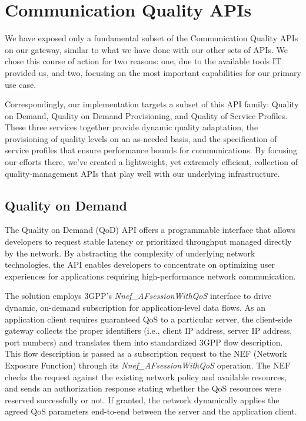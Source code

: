 
\section{Communication Quality APIs}

We have exposed only a fundamental subset of the Communication Quality APIs on our gateway, similar to what we have done with our other sets of APIs. We chose this course of action for two reasons: one, due to the available tools IT provided us, and two, focusing on the most important capabilities for our primary use case.

Correspondingly, our implementation targets a subset of this API family: Quality on Demand, Quality on Demand Provisioning, and Quality of Service Profiles. These three services together provide dynamic quality adaptation, the provisioning of quality levels on an as-needed basis, and the specification of service profiles that ensure performance bounds for communications. By focusing our efforts there, we’ve created a lightweight, yet extremely efficient, collection of quality-management APIs that play well with our underlying infrastructure.

\subsection{Quality on Demand}

The Quality on Demand (QoD) API offers a programmable interface that allows developers to request stable latency or prioritized throughput managed directly by the network. By abstracting the complexity of underlying network technologies, the API enables developers to concentrate on optimizing user experiences for applications requiring high-performance network communication.

The solution employs 3GPP’s \emph{Nnef\_AFsessionWithQoS} interface to drive dynamic, on-demand subscription for application-level data flows. As an application client requires guaranteed QoS to a particular server, the client-side gateway collects the proper identifiers (i.e., client IP address, server IP address, port numbers) and translates them into standardized 3GPP flow description. This flow description is passed as a subscription request to the NEF (Network Exposure Function) through its \emph{Nnef\_AFsessionWithQoS} operation. The NEF checks the request against the existing network policy and available resources, and sends an authorization response stating whether the QoS resources were reserved successfully or not. If granted, the network dynamically applies the agreed QoS parameters end-to-end between the server and the application client.


